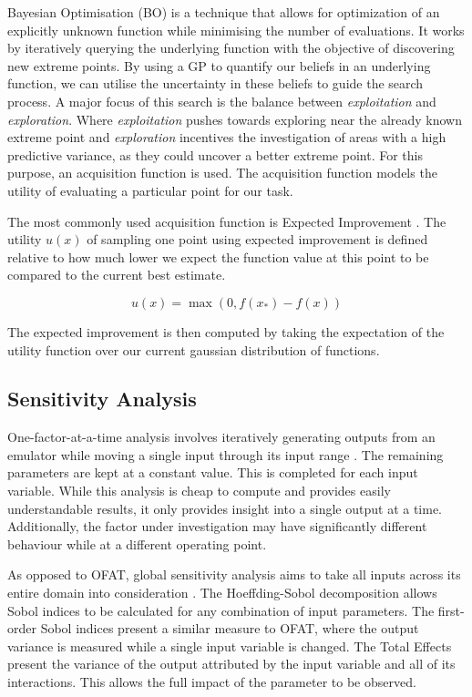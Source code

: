 Bayesian Optimisation (BO) \cite{movckus1975bayesian} is a technique that allows for optimization of an explicitly unknown function while minimising the number of evaluations. It works by iteratively querying the underlying function with the objective of discovering new extreme points. By using a GP to quantify our beliefs in an underlying function, we can utilise the uncertainty in these beliefs to guide the search process. A major focus of this search is the balance between \textit{exploitation} and \textit{exploration}. Where \textit{exploitation} pushes towards exploring near the already known extreme point and \textit{exploration} incentives the investigation of areas with a high predictive variance, as they could uncover a better extreme point. For this purpose, an acquisition function is used. The acquisition function models the utility of evaluating a particular point for our task. 
 
 The most commonly used acquisition function is Expected Improvement \cite{movckus1975bayesian}. The utility $u(x)$ of sampling one point using expected improvement is defined relative to how much lower we expect the function value at this point to be compared to the current best estimate.
 
 \begin{equation}
     u(x) = \max(0, f(x_*)-f(x))
 \end{equation}
 
The expected improvement is then computed by taking the expectation of the utility function over our current gaussian distribution of functions.


\subsection{Sensitivity Analysis}

One-factor-at-a-time analysis involves iteratively generating outputs from an emulator while moving a single input through its input range \cite{ravigupta2015, DELGARM2018181, SALTELLI20101508}. The remaining parameters are kept at a constant value. This is completed for each input variable. While this analysis is cheap to compute and provides easily understandable results, it only provides insight into a single output at a time. Additionally, the factor under investigation may have significantly different behaviour while at a different operating point.  

As opposed to OFAT, global sensitivity analysis aims to take all inputs across its entire domain into consideration \cite{DELGARM2018181, saltelli2008global, SOBOL2001271}. The Hoeffding-Sobol decomposition allows Sobol indices to be calculated for any combination of input parameters. The first-order Sobol indices present a similar measure to OFAT, where the output variance is measured while a single input variable is changed. The Total Effects present the variance of the output attributed by the input variable and all of its interactions. This allows the full impact of the parameter to be observed. 

